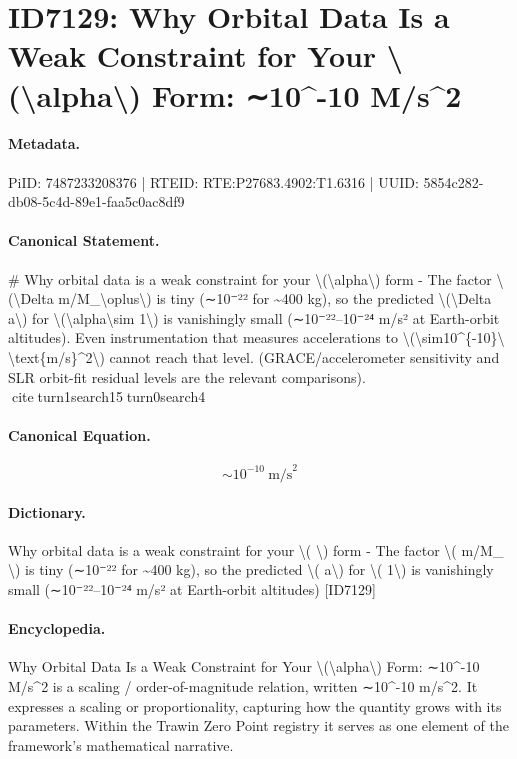 \section*{ID7129: Why Orbital Data Is a Weak Constraint for Your \textbackslash{}(\textbackslash{}alpha\textbackslash{}) Form: ∼10\textasciicircum{}-10 M/s\textasciicircum{}2}
\paragraph{Metadata.}
PiID: 7487233208376 | RTEID: RTE:P27683.4902:T1.6316 | UUID: 5854c282-db08-5c4d-89e1-faa5c0ac8df9

\paragraph{Canonical Statement.}
\# Why orbital data is a weak constraint for your \textbackslash{}(\textbackslash{}alpha\textbackslash{}) form - The factor \textbackslash{}(\textbackslash{}Delta m/M\_\textbackslash{}oplus\textbackslash{}) is tiny (∼10⁻²² for \textasciitilde{}400 kg), so the predicted \textbackslash{}(\textbackslash{}Delta a\textbackslash{}) for \textbackslash{}(\textbackslash{}alpha\textbackslash{}sim 1\textbackslash{}) is vanishingly small (∼10⁻²²–10⁻²⁴ m/s² at Earth-orbit altitudes). Even instrumentation that measures accelerations to \textbackslash{}(\textbackslash{}sim10\textasciicircum{}\{-10\}\textbackslash{} \textbackslash{}text\{m/s\}\textasciicircum{}2\textbackslash{}) cannot reach that level. (GRACE/accelerometer sensitivity and SLR orbit-fit residual levels are the relevant comparisons). citeturn1search15turn0search4

\paragraph{Canonical Equation.}
\[
\sim10^{-10}\ \text{m/s}^2
\]

\paragraph{Dictionary.}
Why orbital data is a weak constraint for your \textbackslash{}( \textbackslash{}) form - The factor \textbackslash{}( m/M\_ \textbackslash{}) is tiny (∼10⁻²² for \textasciitilde{}400 kg), so the predicted \textbackslash{}( a\textbackslash{}) for \textbackslash{}( 1\textbackslash{}) is vanishingly small (∼10⁻²²–10⁻²⁴ m/s² at Earth-orbit altitudes) [ID7129]

\paragraph{Encyclopedia.}
Why Orbital Data Is a Weak Constraint for Your \textbackslash{}(\textbackslash{}alpha\textbackslash{}) Form: ∼10\textasciicircum{}-10 M/s\textasciicircum{}2 is a scaling / order-of-magnitude relation, written ∼10\textasciicircum{}-10 m/s\textasciicircum{}2. It expresses a scaling or proportionality, capturing how the quantity grows with its parameters. Within the Trawin Zero Point registry it serves as one element of the framework's mathematical narrative.

